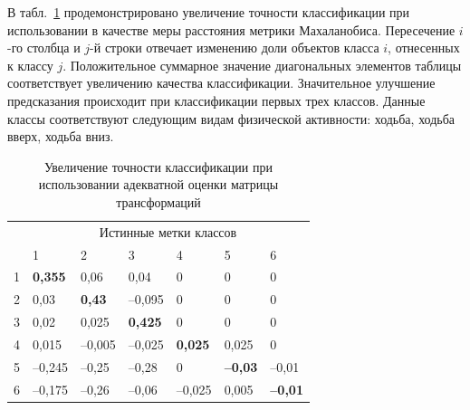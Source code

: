 	В табл.~\ref{improvement} продемонстрировано увеличение точности классификации при использовании в качестве меры расстояния метрики Махаланобиса.
	Пересечение $i$-го столбца и $j$-й строки отвечает изменению доли объектов класса $i$, отнесенных к классу $j$. Положительное суммарное значение диагональных элементов таблицы соответствует увеличению качества классификации. Значительное улучшение предсказания происходит при классификации первых трех классов.
	Данные классы соответствуют следующим видам физической активности: ходьба, ходьба вверх, ходьба вниз.
	
	\begin{table}[!ht]
		\centering
		\caption{Увеличение точности классификации при использовании адекватной оценки матрицы трансформаций}
		\label{improvement}
		\begin{tabular}{|l|l|l|l|l|l|l|}
			\hline
			\multirow{2}{*}{} & \multicolumn{6}{c|}{Истинные метки классов}       \\ \cline{2-7}
			& 1      & 2      & 3      & 4      & 5     & 6     \\ \hline
			1   & \textbf{0,355}  & 0,06   & 0,04   & 0      & 0     & 0     \\ \hline
			2   & 0,03   & \textbf{0,43}   & --0,095 & 0      & 0     & 0     \\ \hline
			3   & 0,02   & 0,025  & \textbf{0,425}  & 0      & 0     & 0     \\ \hline
			4   & 0,015  & --0,005 & --0,025 & \textbf{0,025}  & 0,025 & 0     \\ \hline
			5   & --0,245 & --0,25  & --0,28  & 0      & \textbf{--0,03} & --0,01 \\ \hline
			6   & --0,175 & --0,26  & --0,06  & --0,025 & 0,005 & \textbf{--0,01} \\ \hline
		\end{tabular}
	\end{table}
	